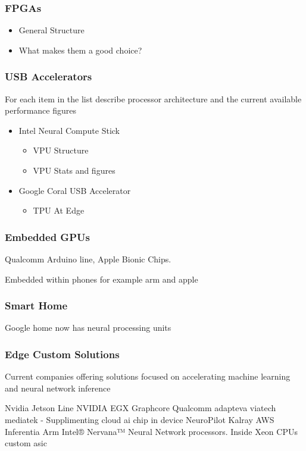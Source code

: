 \documentclass[12pt]{article}
\begin{document}
\subsubsection{FPGAs}
\begin{itemize}
\item
General Structure
\item
What makes them a good choice?
\end{itemize}

\subsubsection{USB Accelerators}
For each item in the list describe processor architecture and the current available performance figures
\begin{itemize}
\item
Intel Neural Compute Stick 
\begin{itemize}
\item
VPU Structure
\item
VPU Stats and figures
\end{itemize}
\item
Google Coral USB Accelerator
\begin{itemize}
\item
TPU At Edge

\end{itemize}
	

\end{itemize}

\subsubsection{Embedded GPUs}
Qualcomm Arduino line, Apple Bionic Chips.

Embedded within phones for example arm and apple
\subsubsection{Smart Home}
Google home now has neural processing units
\subsubsection{Edge Custom Solutions}
Current companies offering solutions focused on accelerating machine learning and neural network inference

Nvidia Jetson Line
NVIDIA EGX
Graphcore
Qualcomm
adapteva
viatech
mediatek - Supplimenting cloud ai chip in device NeuroPilot
Kalray
AWS Inferentia
Arm
Intel® Nervana™ Neural Network processors. Inside Xeon CPUs
custom asic
\end{document}
